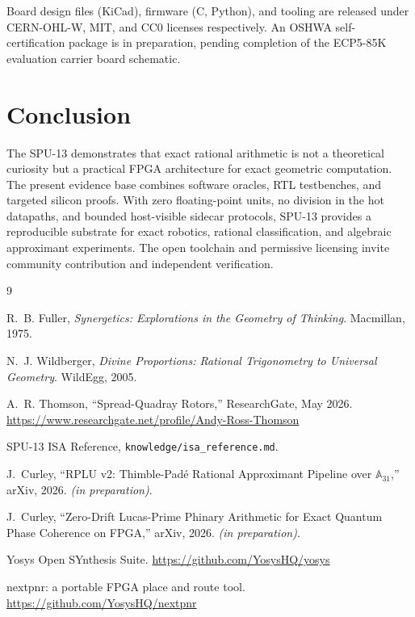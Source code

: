 \documentclass[10pt,twocolumn]{article}
\begin{document}
Board design files (KiCad), firmware (C, Python), and tooling are released
under CERN-OHL-W, MIT, and CC0 licenses respectively. An OSHWA
self-certification package is in preparation, pending completion of the
ECP5-85K evaluation carrier board schematic.

\section{Conclusion}
\label{sec:conclusion}

The SPU-13 demonstrates that exact rational arithmetic is not a theoretical
curiosity but a practical FPGA architecture for exact geometric computation.
The present evidence base combines software oracles, RTL testbenches, and
targeted silicon proofs. With zero floating-point units, no division in the
hot datapaths, and bounded host-visible sidecar protocols, SPU-13 provides a
reproducible substrate for exact robotics, rational classification, and
algebraic approximant experiments. The open toolchain and permissive licensing
invite community contribution and independent verification.


\begin{thebibliography}{9}

R.~B. Fuller, \emph{Synergetics: Explorations in the Geometry of Thinking}.
Macmillan, 1975.

N.~J. Wildberger, \emph{Divine Proportions: Rational Trigonometry to Universal
Geometry}. WildEgg, 2005.

A.~R. Thomson, ``Spread-Quadray Rotors,'' ResearchGate, May 2026.
\url{https://www.researchgate.net/profile/Andy-Ross-Thomson}

SPU-13 ISA Reference, \texttt{knowledge/isa\_reference.md}.

J.~Curley, ``RPLU v2: Thimble-Pad\'e Rational Approximant Pipeline over
$\mathbb{A}_{31}$,'' arXiv, 2026. \textit{(in preparation)}.

J.~Curley, ``Zero-Drift Lucas-Prime Phinary Arithmetic for Exact Quantum
Phase Coherence on FPGA,'' arXiv, 2026. \textit{(in preparation)}.

Yosys Open SYnthesis Suite. \url{https://github.com/YosysHQ/yosys}

nextpnr: a portable FPGA place and route tool.
\url{https://github.com/YosysHQ/nextpnr}

\end{thebibliography}
\end{document}
